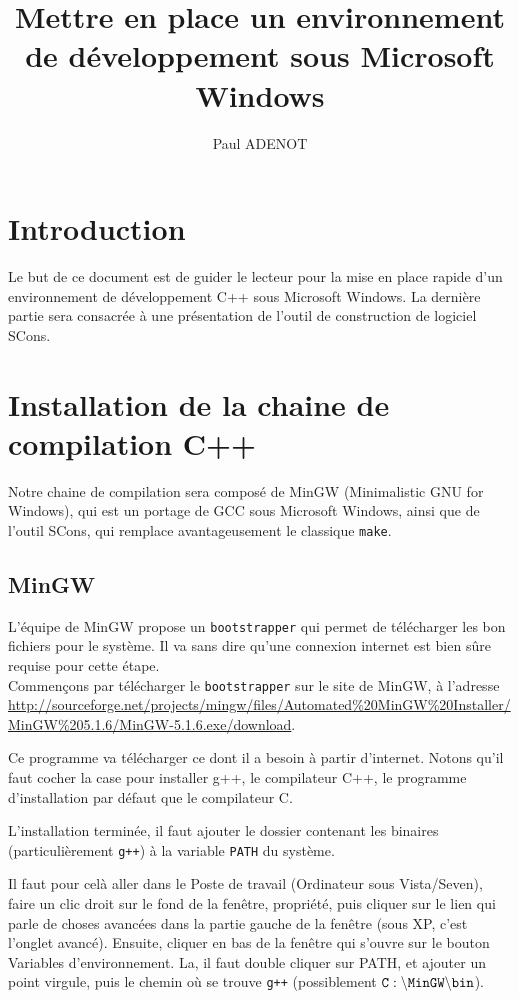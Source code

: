 
\author{Paul ADENOT}
\title{Mettre en place un environnement de développement sous Microsoft Windows}

\maketitle
\tableofcontents
\section{Introduction}
Le but de ce document est de guider le lecteur pour la mise en place rapide d'un environnement de développement C++ sous Microsoft Windows. La dernière partie sera consacrée à une présentation de l'outil de construction de logiciel SCons.

\section{Installation de la chaine de compilation C++}
Notre chaine de compilation sera composé de MinGW (Minimalistic GNU for Windows), qui est un portage de GCC sous Microsoft Windows, ainsi que de l'outil SCons, qui remplace avantageusement le classique {\tt make}.
\subsection{MinGW}
L'équipe de MinGW propose un {\tt bootstrapper} qui permet de télécharger les bon fichiers pour le système. Il va sans dire qu'une connexion internet est bien sûre requise pour cette étape.\\

	Commençons par télécharger le {\tt bootstrapper} sur le site de MinGW, à l'adresse \url{http://sourceforge.net/projects/mingw/files/Automated%20MinGW%20Installer/MinGW%205.1.6/MinGW-5.1.6.exe/download}.

	Ce programme va télécharger ce dont il a besoin à partir d'internet. Notons qu'il faut cocher la case pour installer g++, le compilateur C++, le programme d'installation par défaut que le compilateur C.

	L'installation terminée, il faut ajouter le dossier contenant les binaires (particulièrement {\tt g++}) à la variable {\tt PATH} du système.

	Il faut pour celà aller dans le Poste de travail (Ordinateur sous Vista/Seven), faire un clic droit sur le fond de la fenêtre, propriété, puis cliquer sur le lien qui parle de choses avancées dans la partie gauche de la fenêtre (sous XP, c'est l'onglet avancé). Ensuite, cliquer en bas de la fenêtre qui s'ouvre sur le bouton Variables d'environnement. La, il faut double cliquer sur {PATH}, et ajouter un point virgule, puis le chemin où se trouve {\tt g++} (possiblement {$\tt C:\backslash{}MinGW\backslash{}bin$}).

